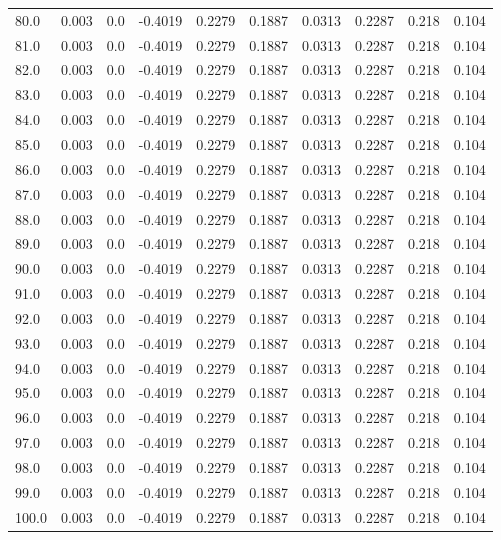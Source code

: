 \begin{longtable}{lrrrrrrrrr}
80.0 & 0.003 & 0.0 & -0.4019 & 0.2279 & 0.1887 & 0.0313 & 0.2287 & 0.218 & 0.104 \\
81.0 & 0.003 & 0.0 & -0.4019 & 0.2279 & 0.1887 & 0.0313 & 0.2287 & 0.218 & 0.104 \\
82.0 & 0.003 & 0.0 & -0.4019 & 0.2279 & 0.1887 & 0.0313 & 0.2287 & 0.218 & 0.104 \\
83.0 & 0.003 & 0.0 & -0.4019 & 0.2279 & 0.1887 & 0.0313 & 0.2287 & 0.218 & 0.104 \\
84.0 & 0.003 & 0.0 & -0.4019 & 0.2279 & 0.1887 & 0.0313 & 0.2287 & 0.218 & 0.104 \\
85.0 & 0.003 & 0.0 & -0.4019 & 0.2279 & 0.1887 & 0.0313 & 0.2287 & 0.218 & 0.104 \\
86.0 & 0.003 & 0.0 & -0.4019 & 0.2279 & 0.1887 & 0.0313 & 0.2287 & 0.218 & 0.104 \\
87.0 & 0.003 & 0.0 & -0.4019 & 0.2279 & 0.1887 & 0.0313 & 0.2287 & 0.218 & 0.104 \\
88.0 & 0.003 & 0.0 & -0.4019 & 0.2279 & 0.1887 & 0.0313 & 0.2287 & 0.218 & 0.104 \\
89.0 & 0.003 & 0.0 & -0.4019 & 0.2279 & 0.1887 & 0.0313 & 0.2287 & 0.218 & 0.104 \\
90.0 & 0.003 & 0.0 & -0.4019 & 0.2279 & 0.1887 & 0.0313 & 0.2287 & 0.218 & 0.104 \\
91.0 & 0.003 & 0.0 & -0.4019 & 0.2279 & 0.1887 & 0.0313 & 0.2287 & 0.218 & 0.104 \\
92.0 & 0.003 & 0.0 & -0.4019 & 0.2279 & 0.1887 & 0.0313 & 0.2287 & 0.218 & 0.104 \\
93.0 & 0.003 & 0.0 & -0.4019 & 0.2279 & 0.1887 & 0.0313 & 0.2287 & 0.218 & 0.104 \\
94.0 & 0.003 & 0.0 & -0.4019 & 0.2279 & 0.1887 & 0.0313 & 0.2287 & 0.218 & 0.104 \\
95.0 & 0.003 & 0.0 & -0.4019 & 0.2279 & 0.1887 & 0.0313 & 0.2287 & 0.218 & 0.104 \\
96.0 & 0.003 & 0.0 & -0.4019 & 0.2279 & 0.1887 & 0.0313 & 0.2287 & 0.218 & 0.104 \\
97.0 & 0.003 & 0.0 & -0.4019 & 0.2279 & 0.1887 & 0.0313 & 0.2287 & 0.218 & 0.104 \\
98.0 & 0.003 & 0.0 & -0.4019 & 0.2279 & 0.1887 & 0.0313 & 0.2287 & 0.218 & 0.104 \\
99.0 & 0.003 & 0.0 & -0.4019 & 0.2279 & 0.1887 & 0.0313 & 0.2287 & 0.218 & 0.104 \\
100.0 & 0.003 & 0.0 & -0.4019 & 0.2279 & 0.1887 & 0.0313 & 0.2287 & 0.218 & 0.104 \\

\end{longtable}
